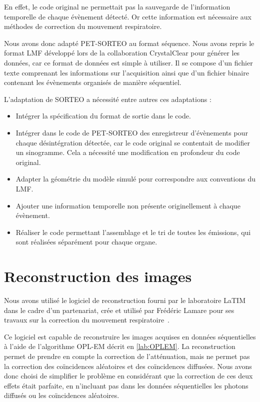 En effet, le code original ne permettait pas la sauvegarde de l'information temporelle de chaque évènement détecté. Or cette information est nécessaire aux méthodes de correction du mouvement respiratoire. 

Nous avons donc adapté PET-SORTEO au format séquence. Nous avons repris le format LMF développé lors de la collaboration CrystalClear pour générer les données, car ce format de données est simple à utiliser. Il se compose d'un fichier texte comprenant les informations sur l'acquisition ainsi que d'un fichier binaire contenant les évènements organisés de manière séquentiel.

 L'adaptation de SORTEO a nécessité entre autres ces adaptations :

\begin{itemize}
\item Intégrer la spécification du format de sortie dans le code.
\item Intégrer dans le code de PET-SORTEO des enregistreur d'évènements pour chaque désintégration détectée, car le code original se contentait de modifier un sinogramme. Cela a nécessité une modification en profondeur du code original.
\item Adapter la géométrie du modèle simulé pour correspondre aux conventions du LMF.
\item Ajouter une information temporelle non présente originellement à chaque évènement.
\item Réaliser le code permettant l'assemblage et le tri de toutes les émissions, qui sont réalisées séparément pour chaque organe.
\end{itemize}


\section{Reconstruction des images}

Nous avons utilisé le logiciel de reconstruction fourni par le laboratoire LaTIM dans le cadre d'un partenariat, crée et utilisé par Frédéric Lamare pour ses travaux sur la correction du mouvement respiratoire~\cite{lamare2007list}.

Ce logiciel est capable de reconstruire les images acquises en données séquentielles à l'aide de l'algorithme OPL-EM décrit en \ref{lab:OPLEM}. La reconstruction permet de prendre en compte la correction de l'atténuation, mais ne permet pas la correction des coïncidences aléatoires et des coïncidences diffusées. Nous avons donc choisi de simplifier le problème en considérant que la correction de ces deux effets était parfaite, en n'incluant pas dans les données séquentielles les photons diffusés ou les coïncidences aléatoires.

